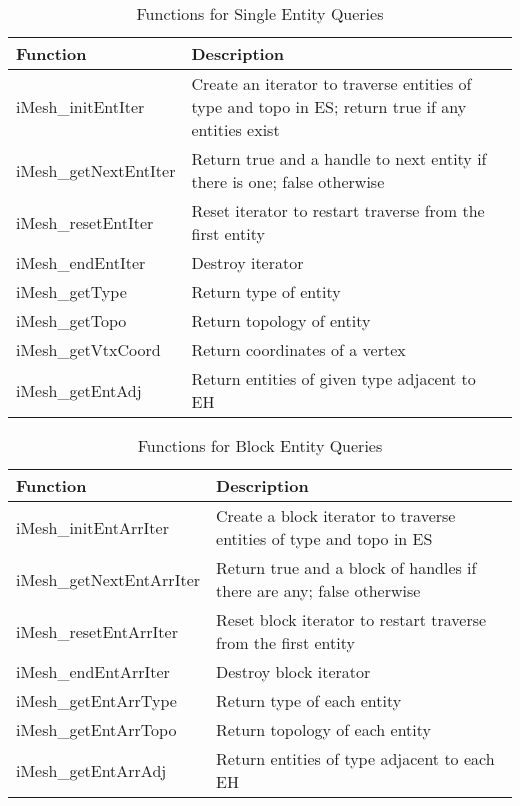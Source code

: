%
\begin{table}

\caption{Functions for Single Entity Queries}

\label{table:Entity} \begin{tabular}{|p{1.25in}|p{223pt}|}
\hline 
{\small Function}&
{\small Description}\tabularnewline
\hline
\hline 
{\small iMesh\_initEntIter}&
{\small Create an iterator to traverse entities of type and topo in
ES; return true if any entities exist}\tabularnewline
\hline 
{\small iMesh\_getNextEntIter}&
{\small Return true and a handle to next entity if there is one; false
otherwise}\tabularnewline
\hline 
{\small iMesh\_resetEntIter}&
{\small Reset iterator to restart traverse from the first entity}\tabularnewline
\hline 
{\small iMesh\_endEntIter}&
{\small Destroy iterator}\tabularnewline
\hline
\hline 
{\small iMesh\_getType}&
{\small Return type of entity}\tabularnewline
\hline 
{\small iMesh\_getTopo}&
{\small Return topology of entity}\tabularnewline
\hline 
{\small iMesh\_getVtxCoord}&
{\small Return coordinates of a vertex}\tabularnewline
\hline 
{\small iMesh\_getEntAdj}&
{\small Return entities of given type adjacent to EH}\tabularnewline
\hline
\end{tabular}
\end{table}


%
\begin{table}

\caption{Functions for Block Entity Queries}

\label{table:EntArr} \begin{tabular}{|p{1.25in}|p{223pt}|}
\hline 
{\small Function}&
{\small Description}\tabularnewline
\hline
\hline 
{\small iMesh\_initEntArrIter}&
{\small Create a block iterator to traverse entities of type and topo
in ES}\tabularnewline
\hline 
{\small iMesh\_getNextEntArrIter}&
{\small Return true and a block of handles if there are any; false
otherwise}\tabularnewline
\hline 
{\small iMesh\_resetEntArrIter}&
{\small Reset block iterator to restart traverse from the first entity}\tabularnewline
\hline 
{\small iMesh\_endEntArrIter}&
{\small Destroy block iterator}\tabularnewline
\hline
\hline 
{\small iMesh\_getEntArrType}&
{\small Return type of each entity}\tabularnewline
\hline 
{\small iMesh\_getEntArrTopo}&
{\small Return topology of each entity}\tabularnewline
\hline 
{\small iMesh\_getEntArrAdj}&
{\small Return entities of type adjacent to each EH}\tabularnewline
\hline
\end{tabular}
\end{table}


